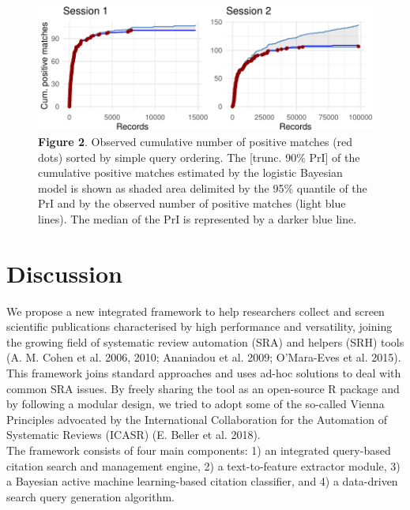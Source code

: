 \documentclass{article}
\begin{document}
\begin{figure}
\centering
\includegraphics{Manuscript_files/figure-latex/performance plot-1.pdf}
\caption{\textbf{Figure 2}. Observed cumulative number of positive
matches (red dots) sorted by simple query ordering. The {[}trunc. 90\%
PrI{]} of the cumulative positive matches estimated by the logistic
Bayesian model is shown as shaded area delimited by the 95\% quantile of
the PrI and by the observed number of positive matches (light blue
lines). The median of the PrI is represented by a darker blue line.}
\end{figure}

\hypertarget{discussion}{%
\section{Discussion}\label{discussion}}

We propose a new integrated framework to help researchers collect and
screen scientific publications characterised by high performance and
versatility, joining the growing field of systematic review automation
(SRA) and helpers (SRH) tools (A. M. Cohen et al. 2006, 2010; Ananiadou
et al. 2009; O'Mara-Eves et al. 2015). This framework joins standard
approaches and uses ad-hoc solutions to deal with common SRA issues. By
freely sharing the tool as an open-source R package and by following a
modular design, we tried to adopt some of the so-called Vienna
Principles advocated by the International Collaboration for the
Automation of Systematic Reviews (ICASR) (E. Beller et al. 2018).\\
The framework consists of four main components: 1) an integrated
query-based citation search and management engine, 2) a text-to-feature
extractor module, 3) a Bayesian active machine learning-based citation
classifier, and 4) a data-driven search query generation algorithm.\\
\end{document}
